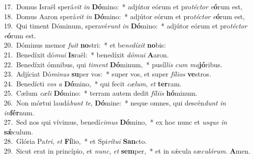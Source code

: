 {17.~}Domus Israël sperá\textit{vit} \textit{in} \textbf{Dó}mino:~* adjútor eórum et pro\textit{té}\textit{ctor} \textit{e}\textbf{ó}rum est,\\
{18.~}Domus Aaron sperá\textit{vit} \textit{in} \textbf{Dó}mino:~* adjútor eórum et pro\textit{té}\textit{ctor} \textit{e}\textbf{ó}rum est,\\
{19.~}Qui timent Dóminum, speravé\textit{runt} \textit{in} \textbf{Dó}mino:~* adjútor eórum et pro\textit{té}\textit{ctor} \textit{e}\textbf{ó}rum est.\\
{20.~}Dóminus memor \textit{fu}\textit{it} \textbf{no}stri:~* et be\textit{ne}\textit{dí}\textit{xit} \textbf{no}bis:\\
{21.~}Benedíxit dó\textit{mu}\textit{i} \textbf{Is}raël:~* benedíxit \textit{dó}\textit{mu}\textit{i} \textbf{A}aron.\\
{22.~}Benedíxit ómnibus, qui \textit{ti}\textit{ment} \textbf{Dó}minum,~* pusíl\textit{lis} \textit{cum} \textit{ma}\textbf{jó}ribus.\\
{23.~}Adjíciat Dó\textit{mi}\textit{nus} \textbf{su}per vos:~* super vos, et super \textit{fí}\textit{li}\textit{os} \textbf{ve}stros.\\
{24.~}Benedícti \textit{vos} \textit{a} \textbf{Dó}mino,~* qui fecit \textit{cæ}\textit{lum}, \textit{et} \textbf{ter}ram.\\
{25.~}Cælum \textit{cæ}\textit{li} \textbf{Dó}mino:~* terram autem dedit \textit{fí}\textit{li}\textit{is} \textbf{hó}minum.\\
{26.~}Non mórtui laudá\textit{bunt} \textit{te}, \textbf{Dó}mine:~* neque omnes, qui descén\textit{dunt} \textit{in} \textit{in}\textbf{fér}num.\\
{27.~}Sed nos qui vívimus, benedí\textit{ci}\textit{mus} \textbf{Dó}mino,~* ex hoc nunc et \textit{us}\textit{que} \textit{in} \textbf{sǽ}culum.\\
{28.~}Glória Pa\textit{tri}, \textit{et} \textbf{Fí}lio,~* et Spi\textit{rí}\textit{tu}\textit{i} \textbf{San}cto.\\
{29.~}Sicut erat in princípio, et \textit{nunc}, \textit{et} \textbf{sem}per,~* et in sǽcula sæ\textit{cu}\textit{ló}\textit{rum}. \textbf{A}men.\\
